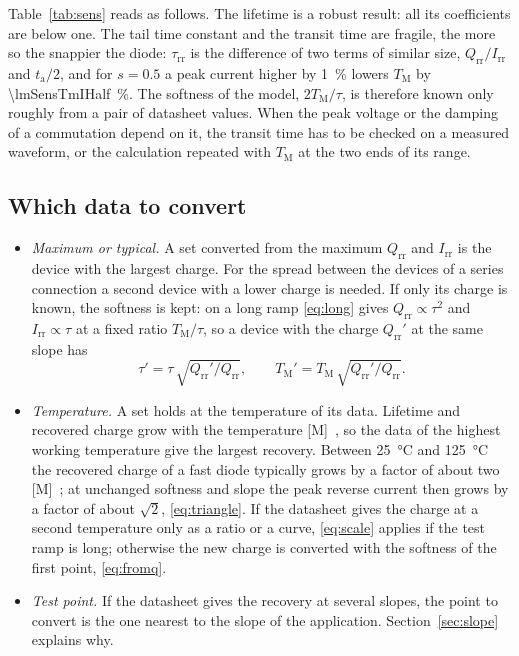 \documentclass[10pt,a4paper]{scrartcl}
\newcommand{\Irr}{I_\mathrm{rr}}
\newcommand{\Qrr}{Q_\mathrm{rr}}
\newcommand{\ta}{t_\mathrm{a}}
\newcommand{\taurr}{\tau_\mathrm{rr}}
\newcommand{\TM}{T_\mathrm{M}}
\begin{document}
Table~\ref{tab:sens} reads as follows. The lifetime is a robust result: all its coefficients are below one. The tail time constant and the transit time are fragile, the more so the snappier the diode: $\taurr$ is the difference of two terms of similar size, $\Qrr/\Irr$ and $\ta/2$, and for $s = 0.5$ a peak current higher by \SI{1}{\percent} lowers $\TM$ by \SI{\lmSensTmIHalf}{\percent}. The softness of the model, $2\TM/\tau$, is therefore known only roughly from a pair of datasheet values. When the peak voltage or the damping of a commutation depend on it, the transit time has to be checked on a measured waveform, or the calculation repeated with $\TM$ at the two ends of its range.

\subsection{Which data to convert}
\label{sec:which}
\begin{itemize}
\item \emph{Maximum or typical.} A set converted from the maximum $\Qrr$ and $\Irr$ is the device with the largest charge. For the spread between the devices of a series connection a second device with a lower charge is needed. If only its charge is known, the softness is kept: on a long ramp \eqref{eq:long} gives $\Qrr \propto \tau^2$ and $\Irr \propto \tau$ at a fixed ratio $\TM/\tau$, so a device with the charge $\Qrr'$ at the same slope has
\begin{equation}
\tau' = \tau\,\sqrt{\Qrr'/\Qrr} , \qquad \TM' = \TM\,\sqrt{\Qrr'/\Qrr} .
\label{eq:scale}
\end{equation}
\item \emph{Temperature.} A set holds at the temperature of its data. Lifetime and recovered charge grow with the temperature [M]~\cite{lutz}, so the data of the highest working temperature give the largest recovery. Between \SI{25}{\celsius} and \SI{125}{\celsius} the recovered charge of a fast diode typically grows by a factor of about two [M]~\cite{lutz}; at unchanged softness and slope the peak reverse current then grows by a factor of about $\sqrt{2}$, \eqref{eq:triangle}. If the datasheet gives the charge at a second temperature only as a ratio or a curve, \eqref{eq:scale} applies if the test ramp is long; otherwise the new charge is converted with the softness of the first point, \eqref{eq:fromq}.
\item \emph{Test point.} If the datasheet gives the recovery at several slopes, the point to convert is the one nearest to the slope of the application. Section~\ref{sec:slope} explains why.
\end{itemize}
\end{document}
